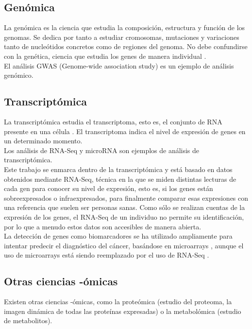 \subsection{Genómica}

La genómica es la ciencia que estudia la composición, estructura y función de los genomas. Se dedica por tanto a estudiar cromosomas, mutaciones y variaciones tanto de nucleótidos concretos como de regiones del genoma. No debe confundirse con la genética, ciencia que estudia los genes de manera individual \cite{Pierce2010}.\\

El análisis GWAS (Genome-wide association study) es un ejemplo de análisis genómico.

\subsection{Transcriptómica}

La transcriptómica estudia el transcriptoma, esto es, el conjunto de RNA presente en una célula \cite{Schmidt2019}. El transcriptoma indica el nivel de expresión de genes en un determinado momento.\\

Los análisis de RNA-Seq y microRNA son ejemplos de análisis de transcriptómica.\\

Este trabajo se enmarca dentro de la transcriptómica y está basado en datos obtenidos mediante RNA-Seq, técnica en la que se miden distintas lecturas de cada gen para conocer su nivel de expresión, esto es, si los genes están sobreexpresados o infraexpresados, para finalmente comparar esas expresiones con una referencia que suelen ser personas sanas. Como sólo se realizan cuentas de la expresión de los genes, el RNA-Seq de un individuo no permite su identificación, por lo que a menudo estos datos son accesibles de manera abierta.\\

La detección de genes como biomarcadores se ha utilizado ampliamente para intentar predecir el diagnóstico del cáncer, basándose en microarrays \cite{Lee2008, Maglietta2007}, aunque el uso de microarrays está siendo reemplazado por el uso de RNA-Seq  \cite{Stark2019, VanVerk2013}.

\subsection{Otras ciencias -ómicas}

Existen otras ciencias -ómicas, como la proteómica (estudio del proteoma, la imagen dinámica de todas las proteínas expresadas) o la metabolómica (estudio de metabolitos).
